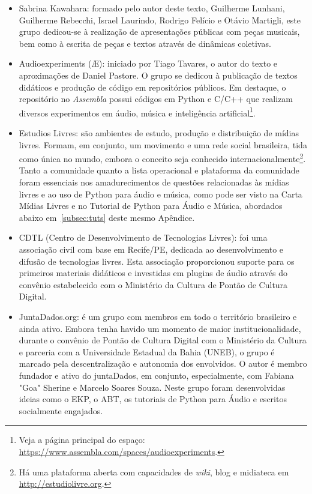 \begin{itemize}
    \item Sabrina Kawahara: formado pelo autor deste texto, Guilherme Lunhani,
    Guilherme Rebecchi, Israel Laurindo, Rodrigo Felício e Otávio Martigli,
    este grupo dedicou-se à realização
    de apresentações públicas com peças musicais, bem como à escrita de peças e textos através
    de dinâmicas coletivas.
    \item Audioexperiments (Æ): iniciado por Tiago Tavares, o autor do texto e aproximações de
    Daniel Pastore. O grupo se dedicou à publicação de textos didáticos e produção
    de código em repositórios públicos. Em destaque, o repositório no \emph{Assembla}
    possui códigos em Python e C/C++ que realizam diversos experimentos em áudio, música
    e inteligência artificial\footnote{Veja a página principal do espaço: \url{https://www.assembla.com/spaces/audioexperiments}.}.
    \item Estudios Livres: são ambientes de estudo, produção e distribuição de mídias livres.
    Formam, em conjunto, um movimento e uma rede social brasileira, tida como única no mundo, embora
    o conceito seja conhecido internacionalmente\footnote{Há uma plataforma aberta com capacidades
    de \emph{wiki}, blog e midiateca em \url{http://estudiolivre.org}.}. Tanto a comunidade quanto
    a lista operacional e plataforma da comunidade foram essenciais nos amadurecimentos de questões
    relacionadas às mídias livres e ao uso de Python para áudio e música, como pode ser visto
    na Carta Mídias Livres e no Tutorial de Python para Áudio e Música, abordados abaixo
    em~\ref{subsec:tuts} deste mesmo Apêndice.
    \item CDTL (Centro de Desenvolvimento de Tecnologias Livres): foi uma associação civil com base em Recife/PE, dedicada ao desenvolvimento e difusão de tecnologias livres. Esta associação proporcionou suporte para os primeiros materiais didáticos e investidas em plugins de áudio através do convênio estabelecido com o Ministério da Cultura de Pontão de Cultura Digital.
    \item JuntaDados.org: é um grupo com membros em todo o território brasileiro e ainda ativo. Embora tenha havido um momento de maior institucionalidade, durante o convênio de Pontão de Cultura Digital com o Ministério da Cultura e parceria com a Universidade Estadual da Bahia (UNEB), o grupo é marcado pela descentralização e autonomia dos envolvidos. O autor é membro fundador e ativo do juntaDados, em conjunto, especialmente, com Fabiana "Goa" Sherine e Marcelo Soares Souza. Neste grupo foram desenvolvidas ideias como o EKP, o ABT, os tutoriais de Python para Áudio e escritos socialmente engajados.

\end{itemize}
